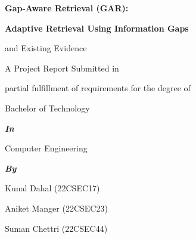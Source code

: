 \documentclass[12pt,a4paper]{report}
\begin{document}

\begin{titlepage}

\thispagestyle{empty}

\begin{center}

\vspace*{0.58in}

{\fontsize{16}{19}\selectfont\bfseries
Gap-Aware Retrieval (GAR):\par}

\vspace{0.08in}

{\fontsize{16}{19}\selectfont\bfseries
Adaptive Retrieval Using Information Gaps\par
and Existing Evidence\par}

\vspace{0.42in}

{\fontsize{12}{18}\selectfont
A Project Report Submitted in\par}

\vspace{0.12in}

{\fontsize{12}{18}\selectfont
partial fulfillment of requirements for the degree of\par}

\vspace{0.12in}

{\fontsize{12}{18}\selectfont
Bachelor of Technology\par}

\vspace{0.10in}

{\fontsize{12}{18}\selectfont\bfseries\itshape
In\par}

\vspace{0.08in}

{\fontsize{12}{18}\selectfont
Computer Engineering\par}

\vspace{0.10in}

{\fontsize{12}{18}\selectfont\bfseries\itshape
By\par}

\vspace{0.08in}

{\fontsize{12}{18}\selectfont
Kunal Dahal (22CSEC17)\par
Aniket Manger (22CSEC23)\par
Suman Chettri (22CSEC44)\par}


\end{center}
\end{titlepage}
\end{document}
